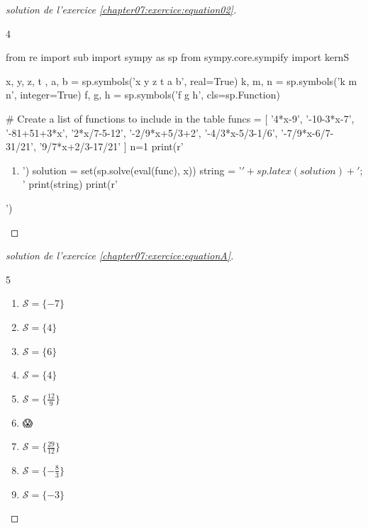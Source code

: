\documentclass[main.tex]{subfiles}
\begin{document}
\begin{proof}[solution de l'exercice \ref{chapter07:exercice:equation02}]\hfill
	
	\begin{multicols}{4}\scriptsize
		\begin{pycode}
from re import sub
import sympy as sp
from sympy.core.sympify import kernS

x, y, z, t , a, b = sp.symbols('x y z t a b', real=True)
k, m, n = sp.symbols('k m n', integer=True)
f, g, h = sp.symbols('f g h', cls=sp.Function)

# Create a list of functions to include in the table
funcs = [
'4*x-9', 
'-10-3*x-7', 
'-81+51+3*x', 
'2*x/7-5-12', 
'-2/9*x+5/3+2', 
'-4/3*x-5/3-1/6',
'-7/9*x-6/7-31/21',
'9/7*x+2/3-17/21'
]
n=1
print(r' \begin{enumerate}[label={$S_{\arabic*}=$},leftmargin=*] ')
for func in funcs:
	print('\item ')
	solution = set(sp.solve(eval(func), x))
	string =  '$'+   sp.latex(solution ) + '$; '
	print(string)
print(r'\end{enumerate} ') 
\end{pycode}
\end{multicols} \scriptsize
\end{proof}
\begin{proof}[solution de l'exercice \ref{chapter07:exercice:equationA}]\hfill
	\begin{multicols}{5}
		\begin{enumerate}[label={$(E_{\arabic*}$)}, leftmargin=*]
			\item $\mathcal{S}=\{-7\}$
			\item $\mathcal{S}=\{4\}$ 
			\item $\mathcal{S}=\{6\}$ 
			\item   $\mathcal{S}=\{4\}$ 
			\item $\mathcal{S}=\{\tfrac{12}{9}\}$  
			\item { 😱}
			\item $\mathcal{S}=\{\tfrac{29}{12}\}$ %
			\item $\mathcal{S}=\{-\tfrac{8}{3}\}$ 
			\item $\mathcal{S}=\{-3\}$ 
		\end{enumerate}
	\end{multicols} \scriptsize	
\end{proof} 
\end{document}
